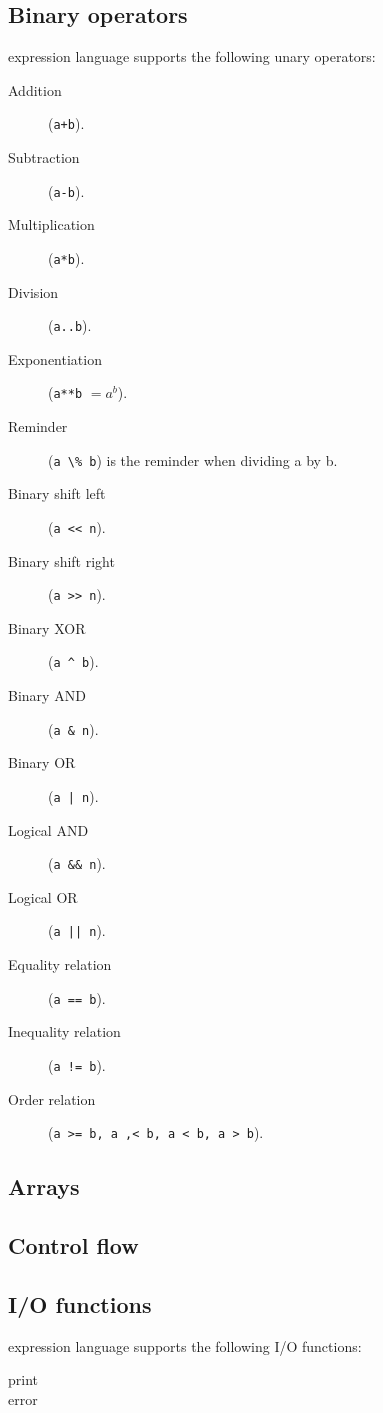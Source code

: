 \subsection{Binary operators}

\LANG expression language supports the following unary operators:
\begin{description}
\item[Addition] (\lstinline|a+b|).
\item[Subtraction] (\lstinline|a-b|).
\item[Multiplication] (\lstinline|a*b|).
\item[Division] (\lstinline|a..b|).
\item[Exponentiation] (\lstinline|a**b| $= a^b$).
\item[Reminder] (\lstinline|a \% b|) is the reminder when dividing a by b.
\item[Binary shift left] (\lstinline|a << n|).
\item[Binary shift right] (\lstinline|a >> n|).
\item[Binary XOR] (\lstinline|a ^ b|).
\item[Binary AND] (\lstinline|a & n|).
\item[Binary OR] (\lstinline!a | n!).
\item[Logical AND] (\lstinline|a && n|).
\item[Logical OR] (\lstinline!a || n!).
\item[Equality relation] (\lstinline|a == b|).
\item[Inequality relation] (\lstinline|a != b|).
\item[Order relation] (\lstinline|a >= b, a ,< b, a < b, a > b|).
\end{description}




\subsection{Arrays}




\subsection{Control flow}




\subsection{I/O functions}

\LANG expression language supports the following I/O functions:
\begin{description}
\item[print]
\item[error]
\end{description}
